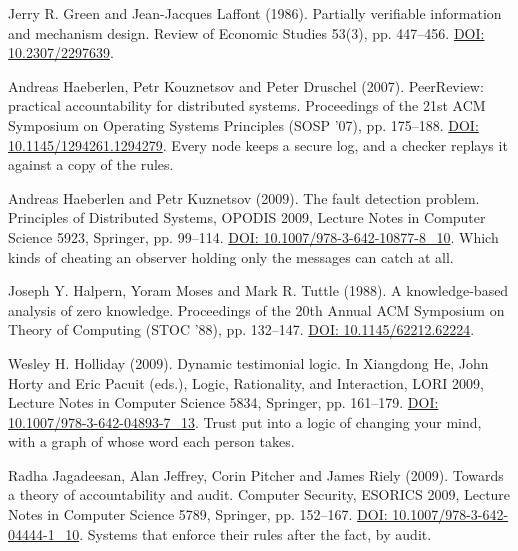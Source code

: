 \documentclass[11pt,twoside]{article}
\theoremstyle{thielethm}
\theoremstyle{thieledef}
\theoremstyle{thieledef}
\theoremstyle{thieledef}
\theoremstyle{thielethm}
\theoremstyle{thieleobs}
\theoremstyle{thielethm}
\begin{document}
\noindent Jerry R. Green and Jean-Jacques Laffont (1986). Partially verifiable information and mechanism design. Review of Economic Studies 53(3), pp. 447--456. \href{https://doi.org/10.2307/2297639}{DOI: 10.2307/2297639}.
\par\medskip

\noindent Andreas Haeberlen, Petr Kouznetsov and Peter Druschel (2007). PeerReview: practical accountability for distributed systems. Proceedings of the 21st ACM Symposium on Operating Systems Principles (SOSP '07), pp. 175--188. \href{https://doi.org/10.1145/1294261.1294279}{DOI: 10.1145/1294261.1294279}. Every node keeps a secure log, and a checker replays it against a copy of the rules.
\par\medskip

\noindent Andreas Haeberlen and Petr Kuznetsov (2009). The fault detection problem. Principles of Distributed Systems, OPODIS 2009, Lecture Notes in Computer Science 5923, Springer, pp. 99--114. \href{https://doi.org/10.1007/978-3-642-10877-8_10}{DOI: 10.1007/978-3-642-10877-8\_10}. Which kinds of cheating an observer holding only the messages can catch at all.
\par\medskip

\noindent Joseph Y. Halpern, Yoram Moses and Mark R. Tuttle (1988). A knowledge-based analysis of zero knowledge. Proceedings of the 20th Annual ACM Symposium on Theory of Computing (STOC '88), pp. 132--147. \href{https://doi.org/10.1145/62212.62224}{DOI: 10.1145/62212.62224}.
\par\medskip

\noindent Wesley H. Holliday (2009). Dynamic testimonial logic. In Xiangdong He, John Horty and Eric Pacuit (eds.), Logic, Rationality, and Interaction, LORI 2009, Lecture Notes in Computer Science 5834, Springer, pp. 161--179. \href{https://doi.org/10.1007/978-3-642-04893-7_13}{DOI: 10.1007/978-3-642-04893-7\_13}. Trust put into a logic of changing your mind, with a graph of whose word each person takes.
\par\medskip

\noindent Radha Jagadeesan, Alan Jeffrey, Corin Pitcher and James Riely (2009). Towards a theory of accountability and audit. Computer Security, ESORICS 2009, Lecture Notes in Computer Science 5789, Springer, pp. 152--167. \href{https://doi.org/10.1007/978-3-642-04444-1_10}{DOI: 10.1007/978-3-642-04444-1\_10}. Systems that enforce their rules after the fact, by audit.
\par\medskip
\end{document}
